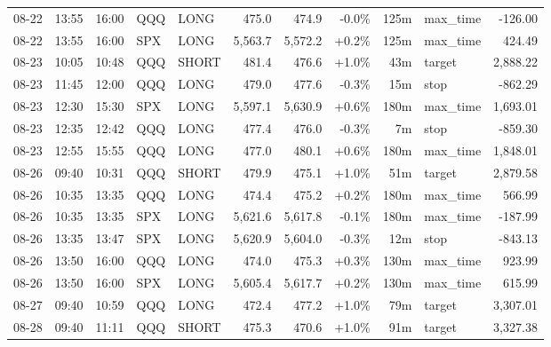 \documentclass[11pt,a4paper,twoside]{article}
\begin{document}
\begin{center}
\begin{longtable}{>{\color{txtmain}}l l l l l r r r r >{\color{txtmain}}l r}
08-22 & 13:55 & 16:00 & QQQ & LONG & 475.0 & 474.9 & \textcolor{lossred}{-0.0\%} & 125m & max\_time & \textcolor{lossred}{-126.00} \\
08-22 & 13:55 & 16:00 & SPX & LONG & 5,563.7 & 5,572.2 & \textcolor{wingreen}{+0.2\%} & 125m & max\_time & \textcolor{wingreen}{424.49} \\
08-23 & 10:05 & 10:48 & QQQ & SHORT & 481.4 & 476.6 & \textcolor{wingreen}{+1.0\%} & 43m & target & \textcolor{wingreen}{2,888.22} \\
08-23 & 11:45 & 12:00 & QQQ & LONG & 479.0 & 477.6 & \textcolor{lossred}{-0.3\%} & 15m & stop & \textcolor{lossred}{-862.29} \\
08-23 & 12:30 & 15:30 & SPX & LONG & 5,597.1 & 5,630.9 & \textcolor{wingreen}{+0.6\%} & 180m & max\_time & \textcolor{wingreen}{1,693.01} \\
08-23 & 12:35 & 12:42 & QQQ & LONG & 477.4 & 476.0 & \textcolor{lossred}{-0.3\%} & 7m & stop & \textcolor{lossred}{-859.30} \\
08-23 & 12:55 & 15:55 & QQQ & LONG & 477.0 & 480.1 & \textcolor{wingreen}{+0.6\%} & 180m & max\_time & \textcolor{wingreen}{1,848.01} \\
08-26 & 09:40 & 10:31 & QQQ & SHORT & 479.9 & 475.1 & \textcolor{wingreen}{+1.0\%} & 51m & target & \textcolor{wingreen}{2,879.58} \\
08-26 & 10:35 & 13:35 & QQQ & LONG & 474.4 & 475.2 & \textcolor{wingreen}{+0.2\%} & 180m & max\_time & \textcolor{wingreen}{566.99} \\
08-26 & 10:35 & 13:35 & SPX & LONG & 5,621.6 & 5,617.8 & \textcolor{lossred}{-0.1\%} & 180m & max\_time & \textcolor{lossred}{-187.99} \\
08-26 & 13:35 & 13:47 & SPX & LONG & 5,620.9 & 5,604.0 & \textcolor{lossred}{-0.3\%} & 12m & stop & \textcolor{lossred}{-843.13} \\
08-26 & 13:50 & 16:00 & QQQ & LONG & 474.0 & 475.3 & \textcolor{wingreen}{+0.3\%} & 130m & max\_time & \textcolor{wingreen}{923.99} \\
08-26 & 13:50 & 16:00 & SPX & LONG & 5,605.4 & 5,617.7 & \textcolor{wingreen}{+0.2\%} & 130m & max\_time & \textcolor{wingreen}{615.99} \\
08-27 & 09:40 & 10:59 & QQQ & LONG & 472.4 & 477.2 & \textcolor{wingreen}{+1.0\%} & 79m & target & \textcolor{wingreen}{3,307.01} \\
08-28 & 09:40 & 11:11 & QQQ & SHORT & 475.3 & 470.6 & \textcolor{wingreen}{+1.0\%} & 91m & target & \textcolor{wingreen}{3,327.38} \\

\end{longtable}
\end{center}
\end{document}
